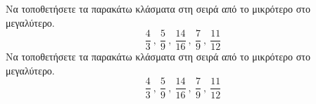 Να τοποθετήσετε τα παρακάτω κλάσματα στη σειρά από το μικρότερο στο μεγαλύτερο.
\[ \frac{4}{3}\ ,\ \frac{5}{9}\ ,\ \frac{14}{16}\ ,\ \frac{7}{9}\ ,\ \dfrac{11}{12} \]
Να τοποθετήσετε τα παρακάτω κλάσματα στη σειρά από το μικρότερο στο μεγαλύτερο.
\[ \frac{4}{3}\ ,\ \frac{5}{9}\ ,\ \frac{14}{16}\ ,\ \frac{7}{9}\ ,\ \dfrac{11}{12} \]
